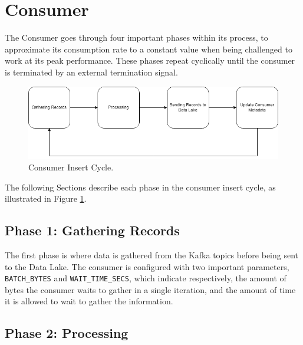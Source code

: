 \section{Consumer} \label{component:consumer}

The Consumer goes through four important phases within its process, to
approximate its consumption rate to a constant value when being challenged to
work at its peak performance. These phases repeat cyclically until the consumer
is terminated by an external termination signal. 

\begin{figure}[htb!] 
    \centering
    \includegraphics[width=\textwidth]{images/consumer/consumer_cycle.png}
    \caption{Consumer Insert Cycle.}
    \label{fig:consumer_cycle} 
\end{figure}

The following Sections describe each phase in the consumer insert cycle, as
illustrated in Figure \ref{fig:consumer_cycle}.

\subsection{Phase 1: Gathering Records}

The first phase is where data is gathered from the Kafka topics before being
sent to the Data Lake. The consumer is configured with two important
parameters, \lstinline{BATCH_BYTES} and \lstinline{WAIT_TIME_SECS}, which
indicate respectively, the amount of bytes the consumer waits to gather in a
single iteration, and the amount of time it is allowed to wait to gather the
information.

\subsection{Phase 2: Processing} \label{consumer:phase2}

